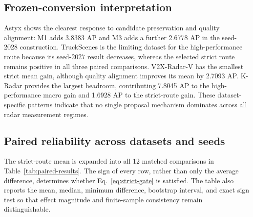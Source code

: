 \documentclass[preprint,12pt,times]{elsarticle}
\newcommand{\tabref}[1]{\textcolor{floatreviewblue}{Table~\ref{#1}}}
\newcommand{\tabref}[1]{Table~\ref{#1}}
\begin{document}
\subsection{Frozen-conversion interpretation}

Astyx shows the clearest response to candidate preservation and quality
alignment: M1 adds 3.8383 AP and M3 adds a further 2.6778 AP in the seed-2028
construction. TruckScenes is the limiting dataset for the high-performance
route because its seed-2027 result decreases, whereas the selected strict route remains
positive in all three paired comparisons. V2X-Radar-V has the smallest strict
mean gain, although quality alignment improves its mean by 2.7093 AP. K-Radar
provides the largest headroom, contributing 7.8045 AP to the high-performance
macro gain and 1.6928 AP to the strict-route gain. These dataset-specific
patterns indicate that no single proposal mechanism dominates across all radar
measurement regimes.

\subsection{Paired reliability across datasets and seeds}

The strict-route mean is expanded into all 12 matched comparisons in
\tabref{tab:paired-results}. The sign of every row, rather than only the
average difference, determines whether Eq.~\eqref{eq:strict-gate} is
satisfied. The table also reports the mean, median, minimum difference,
bootstrap interval, and exact sign test so that effect magnitude and
finite-sample consistency remain distinguishable.
\end{document}
